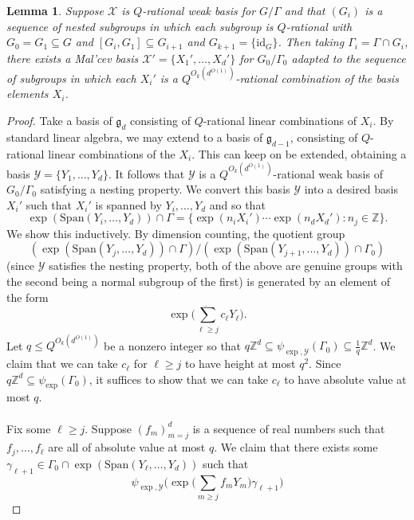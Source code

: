 \documentclass[11pt, a4paper]{amsart}
\theoremstyle{plain}
\theoremstyle{plain}
\newtheorem{lemma}{Lemma}
\theoremstyle{definition}
\theoremstyle{remark}
\numberwithin{equation}{section}
\numberwithin{lemma}{section}
\numberwithin{proposition}{section}
\numberwithin{corollary}{section}
\numberwithin{definition}{section}
\numberwithin{claim}{section}
\begin{document}
\begin{lemma}\label{l:ConstructingMalcev}
Suppose $\mathcal{X}$ is $Q$-rational weak basis for $G/\Gamma$ and that $(G_i)$ is a sequence of nested subgroups in which each subgroup is $Q$-rational with $G_0 = G_1 \subseteq G$ and $[G_i, G_1] \subseteq G_{i + 1}$ and $G_{k + 1} = \{\mathrm{id}_G\}$. Then taking $\Gamma_i = \Gamma \cap G_i$, there exists a Mal'cev basis $\mathcal{X}' = \{X_1', \dots, X_d'\}$ for $G_0/\Gamma_0$ adapted to the sequence of subgroups in which each $X_i'$ is a $Q^{O_k(d^{O(1)})}$-rational combination of the basis elements $X_i$.
\end{lemma}
\begin{proof}
Take a basis of $\mathfrak{g}_d$ consisting of $Q$-rational linear combinations of $X_i$. By standard linear algebra, we may extend to a basis of $\mathfrak{g}_{d - 1}$, consisting of $Q$-rational linear combinations of the $X_i$. This can keep on be extended, obtaining a basis $\mathcal{Y} = \{Y_1, \dots, Y_d\}$. It follows that $\mathcal{Y}$ is a $Q^{O_k(d^{O(1)})}$-rational weak basis of $G_0/\Gamma_0$ satisfying a nesting property. We convert this basis $\mathcal{Y}$ into a desired basis $X_i'$ such that $X_i'$ is spanned by $Y_i, \dots, Y_d$ and so that
$$\exp(\text{Span}(Y_{i}, \dots, Y_d)) \cap \Gamma = \{\exp(n_i X_i') \cdots \exp(n_dX_d'): n_j \in \mathbb{Z}\}.$$
We show this inductively. By dimension counting, the quotient group
$$(\exp(\text{Span}(Y_j, \dots, Y_d)) \cap \Gamma) / (\exp(\text{Span}(Y_{j + 1}, \dots, Y_d)) \cap \Gamma_0)$$
(since $\mathcal{Y}$ satisfies the nesting property, both of the above are genuine groups with the second being a normal subgroup of the first) is generated by an element of the form
$$\overline{\exp\big(\sum_{\ell \ge j} c_\ell Y_\ell\big)}.$$
Let $q \le Q^{O_k(d^{O(1)})}$ be a nonzero integer so that $q\mathbb{Z}^d \subseteq \psi_{\exp, \mathcal{Y}}(\Gamma_0) \subseteq \frac{1}{q}\mathbb{Z}^d$. We claim that we can take $c_\ell$ for $\ell \ge j$ to have height at most $q^2$. Since $q\mathbb{Z}^d \subseteq \psi_{\exp}(\Gamma_0)$, it suffices to show that we can take $c_\ell$ to have absolute value at most $q$. \\\\
Fix some $\ell \ge j$. Suppose $(f_m)_{m = j}^d$ is a sequence of real numbers such that $f_j, \dots, f_\ell$ are all of absolute value at most $q$. We claim that there exists some $\gamma_{\ell+1} \in \Gamma_0 \cap \exp(\text{Span}(Y_\ell, \dots, Y_d))$ such that
$$\psi_{\exp, \mathcal{Y}}\big(\exp\big(\sum_{m \ge j} f_m Y_m\big) \gamma_{\ell+1}\big)$$

\end{proof}
\end{document}
